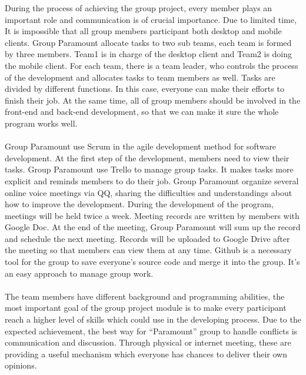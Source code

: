 \documentclass{article}
\begin{document}
	During the process of achieving the group project, every member plays an important role and communication is of crucial importance. Due to limited time, It is impossible that all group members participant both desktop and mobile clients. Group Paramount allocate tasks to two sub teams, each team is formed by three members. Team1 is in charge of the desktop client and Team2 is doing the mobile client. For each team, there is a team leader, who controls the process of the development and allocates tasks to team members as well. Tasks are divided by different functions. In this case, everyone can make their efforts to finish their job. At the same time, all of group members should be involved in the front-end and back-end development, so that we can make it sure the whole program works well.
	\\ \hspace*{\fill} \\
	Group Paramount use Scrum in the agile development method for software development. At the first step of the development, members need to view their tasks. Group Paramount use Trello to manage group tasks. It makes tasks more explicit and reminds members to do their job. Group Paramount organize several online voice meetings via QQ, sharing the difficulties and understandings about how to improve the development. During the development of the program, meetings will be held twice a week. Meeting records are written by members with Google Doc. At the end of the meeting, Group Paramount will sum up the record and schedule the next meeting. Records will be uploaded to Google Drive after the meeting so that members can view them at any time. Github is a necessary tool for the group to save everyone’s source code and merge it into the group. It’s an easy approach to manage group work.
	\\ \hspace*{\fill} \\
	The team members have different background and programming abilities, the most important goal of the group project module is to make every participant reach a higher level of skills which could use in the developing process. Due to the expected achievement, the best way for “Paramount” group to handle conflicts is communication and discussion. Through physical or internet meeting, these are providing a useful mechanism which everyone has chances to deliver their own opinions.
	\\ \hspace*{\fill} \\
\end{document}
